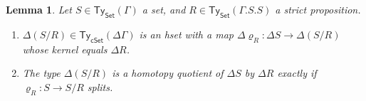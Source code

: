 \documentclass[10pt,a4paper]{article}
\newtheorem{lemma}[theorem]{Lemma}
\theoremstyle{definition}
\theoremstyle{remark}
\newcommand{\Set}{\mathsf{Set}}
\newcommand{\cSet}{\mathsf{cSet}}
\newcommand\Ty{\mathsf{Ty}}
\begin{document}
\begin{lemma}\label{prop:set-quotient-is-homotopy-quotient-iff-surjection-splits}
  Let \(S \in \Ty_{\Set}(\Gamma)\) a set, and \(R \in \Ty_{\Set}(\Gamma.S.S)\) a strict proposition.
  \begin{enumerate}[label=(\arabic*)]
    \item\label{prop:set-quotient-is-homotopy-quotient-iff-surjection-splits:well-defined}
      \(\Delta(S/R) \in \Ty_{\cSet}(\Delta\Gamma)\) is an hset with a map \(\Delta\varrho_{R} \colon \Delta S \to \Delta(S/R)\) whose kernel equals \(\Delta R\). 
    \item\label{prop:set-quotient-is-homotopy-quotient-iff-surjection-splits:characterization}
      The type \(\Delta(S/R)\) is a homotopy quotient of \(\Delta S\) by \(\Delta R\) exactly if \(\varrho_{R} \colon S \to S/R\) splits.
    \end{enumerate}  
\end{lemma}
\end{document}
